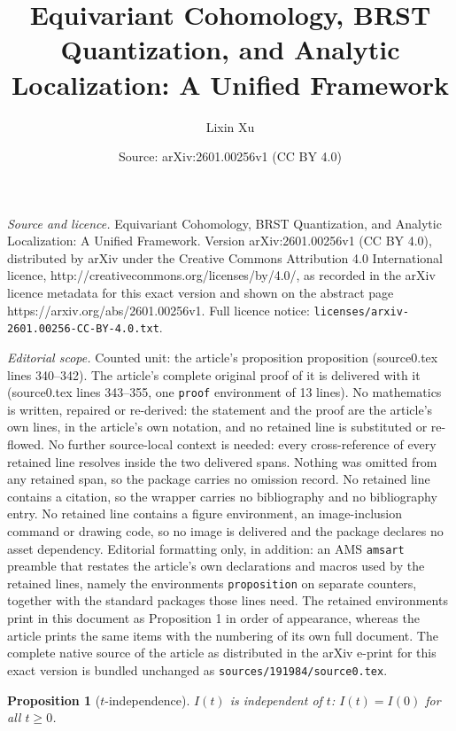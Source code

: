 \documentclass[10pt,a4paper]{amsart}
\title{Equivariant Cohomology, BRST Quantization, and Analytic Localization: A Unified Framework}
\author{Lixin Xu}
\date{Source: arXiv:2601.00256v1 (CC BY 4.0)}
\newtheorem{proposition}{Proposition}
\begin{document}
\maketitle

\noindent\emph{Source and licence.} Equivariant Cohomology, BRST Quantization, and Analytic Localization: A Unified Framework. Version arXiv:2601.00256v1 (CC BY 4.0), distributed by arXiv under the Creative Commons Attribution 4.0 International licence, http://creativecommons.org/licenses/by/4.0/, as recorded in the arXiv licence metadata for this exact version and shown on the abstract page https://arxiv.org/abs/2601.00256v1. Full licence notice: \texttt{licenses/arxiv-2601.00256-CC-BY-4.0.txt}.\par\smallskip

\noindent\textit{Editorial scope.} Counted unit: the article's proposition proposition (source0.tex lines 340--342). The article's complete original proof of it is delivered with it (source0.tex lines 343--355, one \texttt{proof} environment of 13 lines). No mathematics is written, repaired or re-derived: the statement and the proof are the article's own lines, in the article's own notation, and no retained line is substituted or re-flowed.  No further source-local context is needed: every cross-reference of every retained line resolves inside the two delivered spans.  Nothing was omitted from any retained span, so the package carries no omission record.  No retained line contains a citation, so the wrapper carries no bibliography and no bibliography entry.  No retained line contains a figure environment, an image-inclusion command or drawing code, so no image is delivered and the package declares no asset dependency.  Editorial formatting only, in addition: an AMS \texttt{amsart} preamble that restates the article's own declarations and macros used by the retained lines, namely the environments \texttt{proposition} on separate counters, together with the standard packages those lines need.  The retained environments print in this document as Proposition 1 in order of appearance, whereas the article prints the same items with the numbering of its own full document.  The complete native source of the article as distributed in the arXiv e-print for this exact version is bundled unchanged as \texttt{sources/191984/source0.tex}.
\begin{proposition}[$t$-independence]
$I(t)$ is independent of $t$: $I(t) = I(0)$ for all $t \ge 0$.
\end{proposition}
\end{document}
